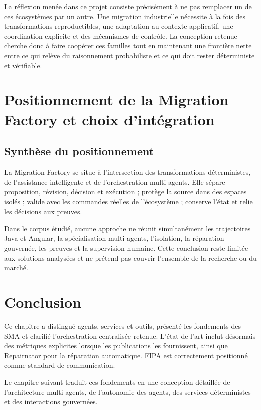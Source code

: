 La réflexion menée dans ce projet consiste précisément à ne pas remplacer un de ces écosystèmes par un autre. Une migration industrielle nécessite à la fois des transformations reproductibles, une adaptation au contexte applicatif, une coordination explicite et des mécanismes de contrôle. La conception retenue cherche donc à faire coopérer ces familles tout en maintenant une frontière nette entre ce qui relève du raisonnement probabiliste et ce qui doit rester déterministe et vérifiable.

\section{Positionnement de la Migration Factory et choix d'intégration}

\subsection{Synthèse du positionnement}

La Migration Factory se situe à l'intersection des transformations déterministes, de l'assistance intelligente et de l'orchestration multi-agents. Elle sépare proposition, révision, décision et exécution ; protège la source dans des espaces isolés ; valide avec les commandes réelles de l'écosystème ; conserve l'état et relie les décisions aux preuves.

Dans le corpus étudié, aucune approche ne réunit simultanément les trajectoires Java et Angular, la spécialisation multi-agents, l'isolation, la réparation gouvernée, les preuves et la supervision humaine. Cette conclusion reste limitée aux solutions analysées et ne prétend pas couvrir l'ensemble de la recherche ou du marché.

\section*{Conclusion}

Ce chapitre a distingué agents, services et outils, présenté les fondements des SMA et clarifié l'orchestration centralisée retenue. L'état de l'art inclut désormais des métriques explicites lorsque les publications les fournissent, ainsi que Repairnator pour la réparation automatique. FIPA est correctement positionné comme standard de communication.

Le chapitre suivant traduit ces fondements en une conception détaillée de l'architecture multi-agents, de l'autonomie des agents, des services déterministes et des interactions gouvernées.
